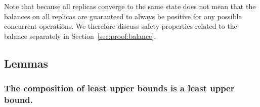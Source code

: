 \documentclass[9pt, oneside]{article}   	%
\begin{document}
Note that because all replicas converge to the same state does not mean that the balances on all replicas are guaranteed to always be positive for any possible concurrent operations. We therefore discuss safety properties related to the balance separately in Section~\ref{sec:proof:balance}.

\subsection{Lemmas}

\subsubsection{The composition of least upper bounds is a least upper bound.}
\label{sec:lemma:lub-composition}
 
\end{document}
